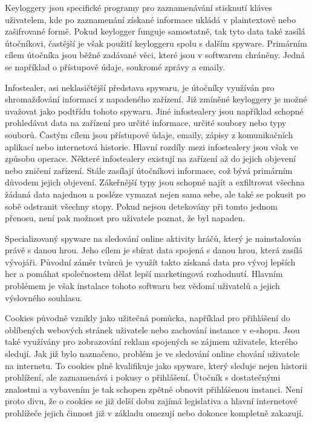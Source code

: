 Keyloggery jsou specifické programy pro zaznamenávání stisknutí kláves uživatelem, kde po zaznamenání získané informace ukládá v plaintextové nebo zašifrované formě.
Pokud keylogger funguje samostatně, tak tyto data také zasílá útočníkovi, častější je však použití keyloggeru spolu s dalším spyware.
Primárním cílem útočníka jsou běžně zadávané věci, které jsou v softwarem chráněny.
Jedná se například o přístupové údaje, soukromé zprávy a emaily.\cite{avast_spyware}

Infostealer, asi neklasičtější představa spywaru, je útočníky využíván pro shromažďování informací z napadeného zařízení.
Již zmíněné keyloggery je možné uvažovat jako podtřídu tohoto spywaru.
Jiné infostealery jsou například schopné prohledávat data na zařízení pro určité informace, určité soubory nebo typy souborů.
Častým cílem jsou přístupové údaje, emaily, zápisy z komunikačních aplikací nebo internetová historie.
Hlavní rozdíly mezi infostealery jsou však ve způsobu operace.
Některé infostealery existují na zařízení až do jejich objevení nebo zničení zařízení.
Stále zasílají útočníkovi informace, což bývá primárním důvodem jejich objevení.
Zákeřnější typy jsou schopné najít a exfiltrovat všechna žádaná data najednou a posléze vymazat nejen sama sebe, ale také se pokusit po sobě odstranit všechny stopy.
Pokud nejsou detekovány při tomto jednom přenosu, není pak možnost pro uživatele poznat, že byl napaden.\cite{avast_spyware}

Specializovaný spyware na sledování online aktivity hráčů, který je nainstalován právě s danou hrou.
Jeho cílem je sbírat data spojená s danou hrou, která zasílá vývojáři.
Původní záměr tvůrců je využít takto získaná data pro vývoj lepších her a pomáhat společnostem dělat lepší marketingová rozhodnutí.
Hlavním problémem je však instalace tohoto softwaru bez vědomí uživatelů a jejich výslovného souhlasu.\cite{avast_spyware}

Cookies původně vznikly jako užitečná pomůcka, například pro přihlášení do oblíbených webových stránek uživatele nebo zachování instance v e-shopu.
Jsou také využívány pro zobrazování reklam spojených se zájmem uživatele, kterého sledují.
Jak již bylo naznačeno, problém je ve sledování online chování uživatele na internetu.
To cookies plně kvalifikuje jako spyware, který sleduje nejen historii prohlížení, ale zaznamenává i pokusy o přihlášení.
Útočník s dostatečnými znalostmi a vybavením je tak schopen zpětně obnovit přihlášenou instanci.
Není proto divu, že o cookies se již delší dobu zajímá legislativa a hlavní internetové prohlížeče jejich činnost již v základu omezují nebo dokonce kompletně zakazují.\cite{avast_spyware}

